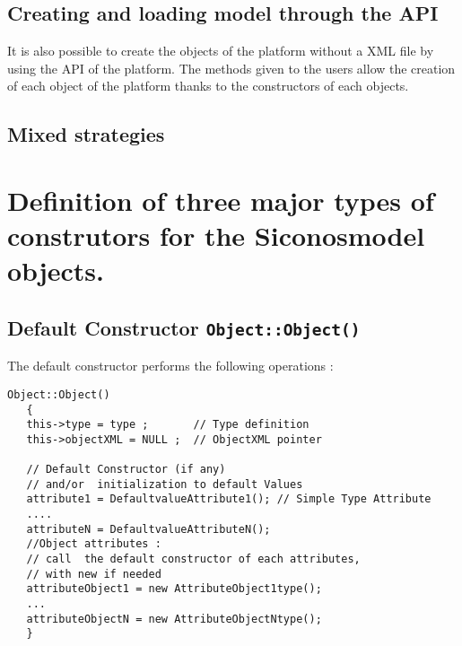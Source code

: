 \subsection{Creating and loading model through the API}

It is also  possible to create the objects of the platform without a XML file by using the API of the platform. The methods given to the users allow the creation of each object of the platform thanks to the constructors of each objects.


\subsection{Mixed strategies}


\section{Definition of three major types of construtors for the Siconosmodel objects.}




\subsection{Default Constructor {\tt Object::Object() } }

The default constructor performs the following operations :
\begin{lstlisting}[frame=single,caption={Default Constructor}]
Object::Object()
   {
   this->type = type ;       // Type definition 
   this->objectXML = NULL ;  // ObjectXML pointer

   // Default Constructor (if any) 
   // and/or  initialization to default Values
   attribute1 = DefaultvalueAttribute1(); // Simple Type Attribute
   ....
   attributeN = DefaultvalueAttributeN();
   //Object attributes :
   // call  the default constructor of each attributes, 
   // with new if needed
   attributeObject1 = new AttributeObject1type();
   ...
   attributeObjectN = new AttributeObjectNtype();
   }
\end{lstlisting} 

